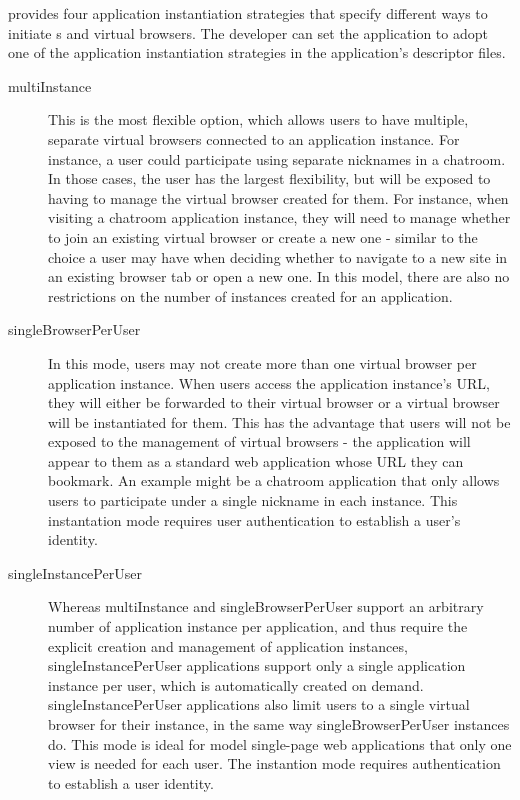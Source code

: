 \cb{} provides four application instantiation strategies that
specify different ways to initiate \appins{}s and virtual browsers.
The developer can set the application to adopt one of the application instantiation 
strategies in the application's descriptor files.

\begin{description}

\item[multiInstance]
    This is the most flexible option, which
    allows users to have multiple, separate virtual browsers connected to an application
    instance. For instance, a user could participate using separate nicknames in a chatroom.
    In those cases, the user has the largest flexibility, but will be exposed to having
    to manage the virtual browser created for them.  For instance, when visiting a chatroom
    application instance, they will need to manage whether
    to join an existing virtual browser or create a new one
    - similar to the choice a user may have when deciding whether to navigate to 
    a new site in an existing browser tab or open a new one.
    In this model, there are also no restrictions on the number of instances created
    for an application.

\item[singleBrowserPerUser]  
    In this mode, users may not create more than one virtual browser per
    application instance.  When users access the application instance's URL, they will either
    be forwarded to their virtual browser or a virtual browser will be instantiated for them.
    This has the advantage that users will not be exposed to the management of 
    virtual browsers - the application will appear to them as a standard web application
    whose URL they can bookmark.
    An example might be a chatroom application that only allows users to participate
    under a single nickname in each instance.
    This instantation mode requires user authentication to establish a user's identity. 

\item[singleInstancePerUser] 
    Whereas multiInstance and singleBrowserPerUser support an arbitrary number of
    application instance per application, and thus require the explicit creation and
    management of application instances, singleInstancePerUser applications support only
    a single application instance per user, which is automatically created on demand.
    singleInstancePerUser applications also limit users to a single virtual browser
    for their instance, in the same way singleBrowserPerUser instances do.
    This mode is ideal for model single-page web applications that only one view is needed
    for each user.
    The instantion mode  requires authentication to establish a user identity. 


\end{description}

